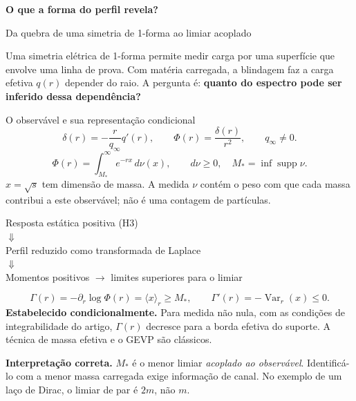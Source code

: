 \documentclass[11pt,a4paper]{article}
\newcommand{\titlepageof}[3]{\vspace*{2mm}{\small\color{rust}\textbf{#1}}\par
 {\LARGE\bfseries\color{ink}#2}\par{\large #3}\par\vspace{2mm}}
\newcommand{\M}{M_*}
\begin{document}
\titlepageof{01 / PERGUNTA CENTRAL}{O que a forma do perfil revela?}{Da quebra de uma simetria de 1-forma ao limiar acoplado}
Uma simetria elétrica de 1-forma permite medir carga por uma superfície que
envolve uma linha de prova. Com matéria carregada, a blindagem faz a carga
efetiva $q(r)$ depender do raio. A pergunta é: \textbf{quanto do espectro pode
ser inferido dessa dependência?}
\begin{panel}{O observável e sua representação condicional}
\begin{equation*}
 \delta(r)=-\frac{r}{q_\infty}q'(r),\qquad \Phi(r)=\frac{\delta(r)}{r^2},
 \qquad q_\infty\ne0.
\end{equation*}
\begin{equation*}
 \Phi(r)=\int_{\M}^\infty e^{-rx}\,d\nu(x),\qquad
 d\nu\ge0,\quad \M=\inf\operatorname{supp}\nu.
\end{equation*}
$x=\sqrt{s}$ tem dimensão de massa. A medida $\nu$ contém o peso com que
cada massa contribui a este observável; não é uma contagem de partículas.
\end{panel}
\begin{center}\small
Resposta estática positiva (H3)\\[2pt]
$\Downarrow$\\[-1pt]
Perfil reduzido como transformada de Laplace\\[2pt]
$\Downarrow$\\[-1pt]
Momentos positivos $\longrightarrow$ limites superiores para o limiar
\end{center}
\begin{equation*}
 \Gamma(r)=-\partial_r\log\Phi(r)=\langle x\rangle_r\ge\M,
 \qquad \Gamma'(r)=-\operatorname{Var}_r(x)\le0.
\end{equation*}
\textbf{Estabelecido condicionalmente.} Para medida não nula, com as condições
de integrabilidade do artigo, $\Gamma(r)$ decresce para a borda efetiva do
suporte. A técnica de massa efetiva e o GEVP são clássicos.

\textbf{Interpretação correta.} $\M$ é o menor limiar \emph{acoplado ao
observável}. Identificá-lo com a menor massa carregada exige informação de
canal. No exemplo de um laço de Dirac, o limiar de par é $2m$, não $m$.
\end{document}
